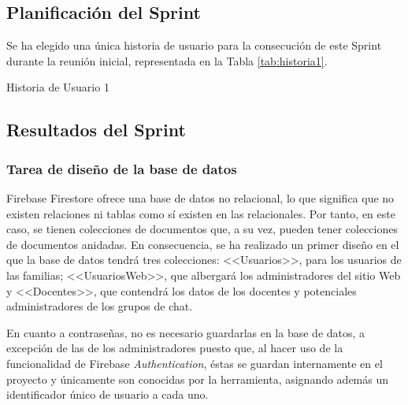 \subsection{Planificación del Sprint}
Se ha elegido una única historia de usuario para la consecución de este Sprint durante la reunión inicial, representada en la Tabla \ref{tab:historia1}.

\begin{table}[hp]
	\centering
	{\small
		
	}
	\caption[Historia de Usuario 1]
	{Historia de Usuario 1}
	\label{tab:historia1}
\end{table}

\subsection{Resultados del Sprint}
\subsubsection{Tarea de diseño de la base de datos}
Firebase Firestore ofrece una base de datos no relacional, lo que significa que no existen relaciones ni tablas como sí existen en las relacionales. Por tanto, en este caso, se tienen colecciones de documentos que, a su vez, pueden tener colecciones de documentos anidadas. En consecuencia, se ha realizado un primer diseño en el que la base de datos tendrá tres colecciones: <<Usuarios>>, para los usuarios de las familias; <<UsuariosWeb>>, que albergará los administradores del sitio Web y <<Docentes>>, que contendrá los datos de los docentes y potenciales administradores de los grupos de chat.

En cuanto a contraseñas, no es necesario guardarlas en la base de datos, a excepción de las de los administradores puesto que, al hacer uso de la funcionalidad de Firebase \textit{Authentication}, éstas se guardan internamente en el proyecto y únicamente son conocidas por la herramienta, asignando además un identificador único de usuario a cada uno.

